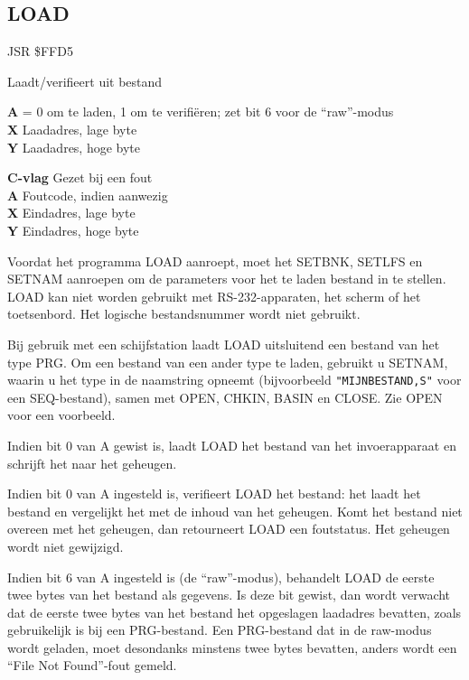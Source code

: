 \subsection{LOAD}
\label{KERNAL Jump Table!LOAD}
\begin{description}[leftmargin=2cm,style=nextline]
    \item [Adres:] JSR \$FFD5    \item [Omschrijving:] Laadt/verifieert uit bestand    \item [Invoer:]        \textbf{A} = 0 om te laden, 1 om te verifiëren; zet bit 6 voor de ``raw''-modus \\        \textbf{X} Laadadres, lage byte \\        \textbf{Y} Laadadres, hoge byte    \item [Uitvoer:]        \textbf{C-vlag} Gezet bij een fout \\        \textbf{A} Foutcode, indien aanwezig \\        \textbf{X} Eindadres, lage byte \\        \textbf{Y} Eindadres, hoge byte    \item [Opmerkingen:]        Voordat het programma LOAD aanroept, moet het SETBNK, SETLFS en SETNAM aanroepen om de parameters voor het te laden bestand in te stellen. LOAD kan niet worden gebruikt met RS-232-apparaten, het scherm of het toetsenbord. Het logische bestandsnummer wordt niet gebruikt.

        Bij gebruik met een schijfstation laadt LOAD uitsluitend een bestand van het type PRG. Om een bestand van een ander type te laden, gebruikt u SETNAM, waarin u het type in de naamstring opneemt (bijvoorbeeld \texttt{"MIJNBESTAND,S"} voor een SEQ-bestand), samen met OPEN, CHKIN, BASIN en CLOSE. Zie OPEN voor een voorbeeld.

        Indien bit 0 van A gewist is, laadt LOAD het bestand van het invoerapparaat en schrijft het naar het geheugen.

        Indien bit 0 van A ingesteld is, verifieert LOAD het bestand: het laadt het bestand en vergelijkt het met de inhoud van het geheugen. Komt het bestand niet overeen met het geheugen, dan retourneert LOAD een foutstatus. Het geheugen wordt niet gewijzigd.

        Indien bit 6 van A ingesteld is (de ``raw''-modus), behandelt LOAD de eerste twee bytes van het bestand als gegevens. Is deze bit gewist, dan wordt verwacht dat de eerste twee bytes van het bestand het opgeslagen laadadres bevatten, zoals gebruikelijk is bij een PRG-bestand. Een PRG-bestand dat in de raw-modus wordt geladen, moet desondanks minstens twee bytes bevatten, anders wordt een ``File Not Found''-fout gemeld.


\end{description}
